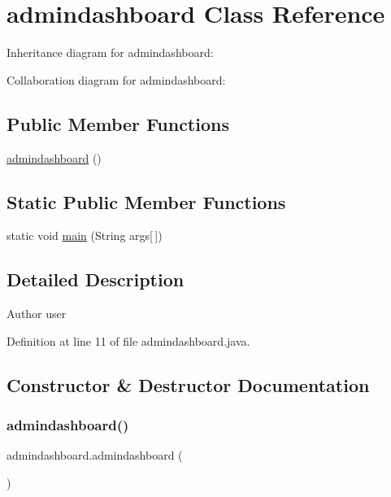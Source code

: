 \hypertarget{classadmindashboard}{}\section{admindashboard Class Reference}
\label{classadmindashboard}


Inheritance diagram for admindashboard\+:


Collaboration diagram for admindashboard\+:
\subsection*{Public Member Functions}
\begin{DoxyCompactItemize}
\item 
\mbox{\hyperlink{classadmindashboard_a23a90976cdc4f77b13ca1801cb47e1d4}{admindashboard}} ()
\end{DoxyCompactItemize}
\subsection*{Static Public Member Functions}
\begin{DoxyCompactItemize}
\item 
static void \mbox{\hyperlink{classadmindashboard_ae694a8be2f02c25b20c6985cbbe3ef01}{main}} (String args\mbox{[}$\,$\mbox{]})
\end{DoxyCompactItemize}


\subsection{Detailed Description}
\begin{DoxyAuthor}{Author}
user 
\end{DoxyAuthor}


Definition at line 11 of file admindashboard.\+java.



\subsection{Constructor \& Destructor Documentation}
\mbox{\label{classadmindashboard_a23a90976cdc4f77b13ca1801cb47e1d4}} 
\subsubsection{\texorpdfstring{admindashboard()}{admindashboard()}}
{\footnotesize\ttfamily admindashboard.\+admindashboard (\begin{DoxyParamCaption}{ }\end{DoxyParamCaption})}

